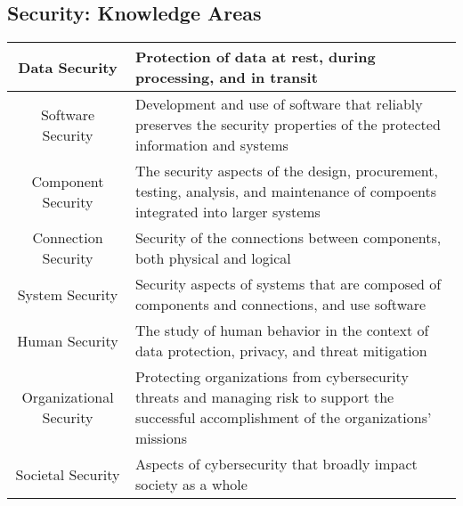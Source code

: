 \documentclass{math}
\begin{document}
\subsection*{Security: Knowledge Areas}
\begin{center}
  \begin{tabular}{|c|p{10cm}|}
    \hline
    Data Security & Protection of data at rest, during processing, and in
      transit \\
    \hline
    Software Security & Development and use of software that reliably preserves
      the security properties of the protected information and systems \\
    \hline
    Component Security & The security aspects of the design, procurement,
      testing, analysis, and maintenance of compoents integrated into larger
      systems \\
    \hline
    Connection Security & Security of the connections between components, both
      physical and logical \\
    \hline
    System Security & Security aspects of systems that are composed of
      components and connections, and use software \\
    \hline
    Human Security & The study of human behavior in the context of data
      protection, privacy, and threat mitigation \\
    \hline
    Organizational Security & Protecting organizations from cybersecurity
      threats and managing risk to support the successful accomplishment of the
      organizations' missions \\
    \hline
    Societal Security & Aspects of cybersecurity that broadly impact society as
      a whole \\
    \hline
  \end{tabular}
\end{center}
\end{document}
